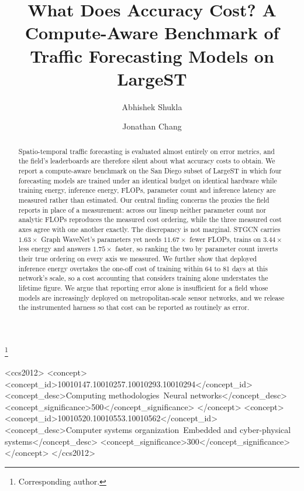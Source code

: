 \documentclass[manuscript,screen,review]{acmart}
\begin{document}
\title{What Does Accuracy Cost? A Compute-Aware Benchmark of
Traffic Forecasting Models on LargeST}

\author{Abhishek Shukla}
\thanks{Corresponding author.}

\author{Jonathan Chang}

\begin{abstract}
Spatio-temporal traffic forecasting is evaluated almost entirely on error
metrics, and the field's leaderboards are therefore silent about what
accuracy costs to obtain. We report a compute-aware benchmark on the San
Diego subset of LargeST in which four forecasting models are trained under
an identical budget on identical hardware while training energy, inference
energy, FLOPs, parameter count and inference latency are measured rather
than estimated. Our central finding concerns the proxies the field reports
in place of a measurement: across our lineup neither parameter count nor
analytic FLOPs reproduces the measured cost ordering, while the three
measured cost axes agree with one another exactly. The discrepancy is not
marginal. STGCN carries $1.63\times$ Graph WaveNet's parameters yet needs
$11.67\times$ fewer FLOPs, trains on $3.44\times$ less energy and answers
$1.75\times$ faster, so ranking the two by parameter count inverts their
true ordering on every axis we measured. We further show that deployed
inference energy overtakes the one-off cost of training within 64 to 81
days at this network's scale, so a cost accounting that considers training
alone understates the lifetime figure. We argue that reporting error alone
is insufficient for a field whose models are increasingly deployed on
metropolitan-scale sensor networks, and we release the instrumented harness
so that cost can be reported as routinely as error.
\end{abstract}

\begin{CCSXML}
<ccs2012>
<concept>
<concept_id>10010147.10010257.10010293.10010294</concept_id>
<concept_desc>Computing methodologies~Neural networks</concept_desc>
<concept_significance>500</concept_significance>
</concept>
<concept>
<concept_id>10010520.10010553.10010562</concept_id>
<concept_desc>Computer systems organization~Embedded and cyber-physical systems</concept_desc>
<concept_significance>300</concept_significance>
</concept>
</ccs2012>
\end{CCSXML}
\end{document}
